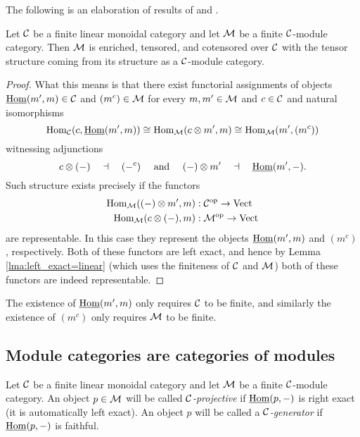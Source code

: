 \documentclass{amsart}
\begin{document}
The following is an elaboration of results of \cite{MR1976459} and \cite{MR2119143}. %
\begin{proposition} \label{thm:enrichment-of-mod-cats}
	Let $\mathcal C$ be a finite linear monoidal category and let $\mathcal M$ be a finite $\mathcal C$-module category. Then $\mathcal M$ is enriched, tensored, and cotensored over $\mathcal C$ with the tensor structure coming from its structure as a $\mathcal C$-module category.
\end{proposition}

\begin{proof}
	What this means is that there exist functorial assignments of objects $\operatorname{\underline{Hom}}(m', m) \in \mathcal C$ and $(m^c) \in \mathcal M$ for every $m,m' \in \mathcal M$ and $c \in \mathcal C$ and natural isomorphisms
	\begin{equation*}
		\operatorname{Hom}_\mathcal C(c, \operatorname{\underline{Hom}}(m', m)) \cong \operatorname{Hom}_\mathcal M(c \otimes m', m) \cong \operatorname{Hom}_\mathcal M( m', (m^c))
	\end{equation*}
	witnessing adjunctions
	\begin{equation*}
			c \otimes (-) \quad \dashv\quad (-^c) \quad \textrm{ and } \quad (-) \otimes m' \quad \dashv \quad \operatorname{\underline{Hom}}(m', -).
	\end{equation*}
Such structure exists precisely if the functors
\begin{align*}
	\operatorname{Hom}_\mathcal M((-)\otimes m', m): \; & \mathcal C^{\mathrm{op}} \to \mathrm{Vect} \\
	\operatorname{Hom}_\mathcal M(c \otimes (-), m): \; & \mathcal M^{\mathrm{op}} \to \mathrm{Vect}
\end{align*}
are representable. In this case they represent the objects $\operatorname{\underline{Hom}}(m', m)$ and $(m^c)$, respectively. Both of these functors are left exact, and hence by Lemma \ref{lma:left_exact=linear} (which uses the finiteness of $\mathcal C$ and $\mathcal M$) both of these functors are indeed representable. 
\end{proof}

\begin{remark}
	The existence of $\operatorname{\underline{Hom}}(m', m)$ only requires $\mathcal C$ to be finite, and similarly the existence of $(m^c)$ only requires $\mathcal M$ to be finite.
\end{remark}


\subsection{Module categories are categories of modules}

\begin{definition}
	Let $\mathcal C$ be a finite linear monoidal category and let $\mathcal M$ be a finite $\mathcal C$-module category. An object $p \in \mathcal M$ will be called {\em $\mathcal C$-projective} if $\operatorname{\underline{Hom}}(p, -)$ is right exact (it is automatically left exact). An object $p$ will be called a {\em $\mathcal C$-generator} if $\operatorname{\underline{Hom}}(p,-)$ is faithful. 
\end{definition}
\end{document}
